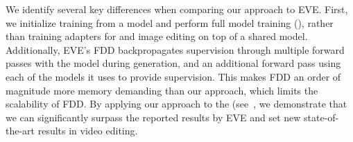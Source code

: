 We identify several key differences when comparing our approach to EVE.
First, we initialize training from a \textToV model and perform full model training (), rather than training adapters for \textToV and image editing on top of a shared \textToI model.
Additionally, EVE's FDD backpropagates supervision through multiple forward passes with the model during generation, and an additional forward pass using each of the models it uses to provide supervision.
This makes FDD an order of magnitude more memory demanding than our approach, which limits the scalability of FDD.
By applying our approach to the \OursVideo (see~, we demonstrate that we can significantly surpass the reported results by EVE and set new state-of-the-art results in video editing.
